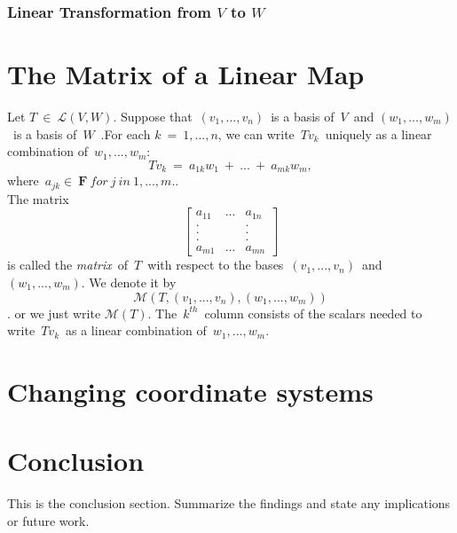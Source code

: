 \documentclass[12pt]{article} %
\begin{document}
\subsubsection{Linear Transformation from $V$ to $W$}



\section{The Matrix of a Linear Map}
Let $T\ \in\ \mathcal{L}(V,W)$. Suppose that\ $(v_{1},...,v_{n})$\ is a basis of\ $V$\ and 
$(w_{1},...,w_{m})$\ is a basis of\ $W$\ .For each $k\ =\ 1,...,n$, we can write\ $Tv_{k}$\ 
uniquely as a linear combination of\ $w_{1},...,w_{m}$: 
$$Tv_{k}\ =\ a_{1k}w_{1}\ +\ ...\ +\ a_{mk}w_{m},$$
where\ $a_{jk}\in\ \mathbf{F}\ for\ j\ in\ 1,...,m.$.\\
The matrix
$$
\begin{bmatrix}
a_{11} &  ... & a_{1n}\\
.& &.\\
.& &.\\
.& &.\\
a_{m1} & ... & a_{mn}
\end{bmatrix}
$$
is called the \textit{matrix}\ of\ $T$\ with respect to the 
bases\ $(v_{1},...,v_{n})$\ and\ $(w_{1},...,w_{m})$.
We denote it by 
$$\mathcal{M}(T,(v_{1},...,v_{n}),(w_{1},...,w_{m}))$$.
or we just write $\mathcal{M}(T)$. The\ $k^{th}$\ column consists of the 
scalars needed to write\ $Tv_{k}$\ as a linear combination of\ $w_{1},...,w_{m}$. \\

\section{Changing coordinate systems}



\section{Conclusion}
This is the conclusion section. Summarize the findings and state any implications or future work.

\end{document}
